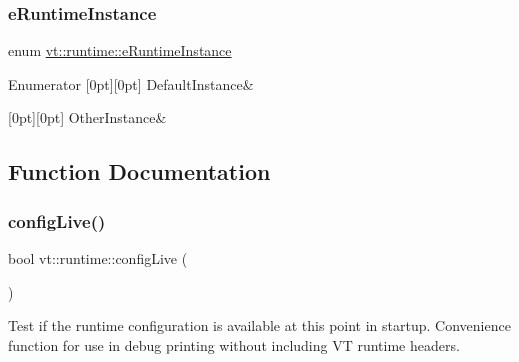 \subsubsection{\texorpdfstring{e\+Runtime\+Instance}{eRuntimeInstance}}
{\footnotesize\ttfamily enum \hyperlink{namespacevt_1_1runtime_afca910c1b38b3975f7c1da8001a77d58}{vt\+::runtime\+::e\+Runtime\+Instance}}

\begin{DoxyEnumFields}{Enumerator}
[0pt][0pt]{}\mbox{\label{namespacevt_1_1runtime_afca910c1b38b3975f7c1da8001a77d58af4b803eff3cdc140ed473828f9c89101}} 
Default\+Instance&\\
\hline

[0pt][0pt]{}\mbox{\label{namespacevt_1_1runtime_afca910c1b38b3975f7c1da8001a77d58af541bede5bc84a16357c26d30a508ff4}} 
Other\+Instance&\\
\hline

\end{DoxyEnumFields}


\subsection{Function Documentation}
\mbox{\label{namespacevt_1_1runtime_a1b0a3ff1332edc6e0fccbbbc803ac895}} 
\subsubsection{\texorpdfstring{config\+Live()}{configLive()}}
{\footnotesize\ttfamily bool vt\+::runtime\+::config\+Live (\begin{DoxyParamCaption}{ }\end{DoxyParamCaption})}



Test if the runtime configuration is available at this point in startup. Convenience function for use in debug printing without including VT runtime headers. 

